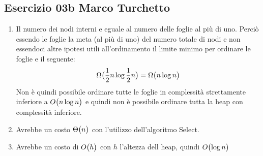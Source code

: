 
\subsection[03b MT]{Esercizio 03b Marco Turchetto}

\begin{enumerate}[label=(\alph*)]
\item Il numero dei nodi interni e eguale al numero delle foglie al più di uno.
	Perciò essendo le foglie la meta (al più di uno) del numero totale di nodi 
	e non essendoci altre ipotesi utili all'ordinamento il limite minimo per
	ordinare le foglie e il seguente:
	\begin{equation*}
		\Omega\bigl(\frac{1}{2}n \log{\frac{1}{2}n} \bigr) = \Omega\bigl(n \log n\bigr)
	\end{equation*}
	Non è quindi possibile ordinare tutte le foglie in complessità strettamente
	inferiore a $O\bigl(n \log n\bigr)$ e quindi non è possibile ordinare tutta la heap
	con complessità inferiore.
	
\item Avrebbe un costo $\Theta\bigl(n\bigr)$ con l'utilizzo dell'algoritmo Select.

\item Avrebbe un costo di $O\bigl(h\bigr)$ con $h$ l'altezza dell heap, quindi $O\bigl(\log n\bigr)$
\end{enumerate}


